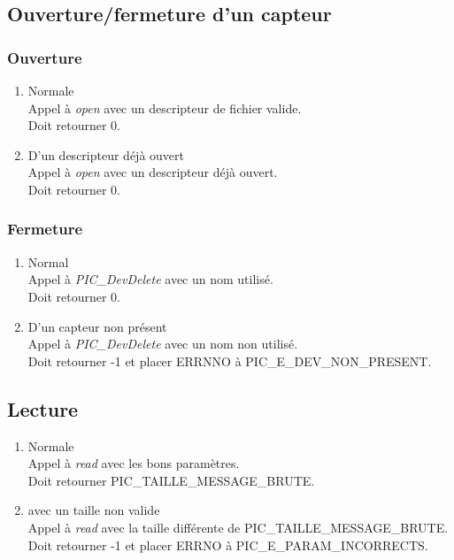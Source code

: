 \subsection{Ouverture/fermeture d'un capteur}
    \subsubsection{Ouverture}
        \begin{enumerate}
            \item Normale\\
Appel à \textsl{open} avec un descripteur de fichier valide.\\
Doit retourner 0.
            \item D'un descripteur déjà ouvert\\
Appel à \textsl{open} avec un descripteur déjà ouvert.\\
Doit retourner 0.
        \end{enumerate}

    \subsubsection{Fermeture}
        \begin{enumerate}
            \item Normal\\
Appel à \textsl{PIC\_DevDelete} avec un nom utilisé.\\
Doit retourner 0.
            \item D'un capteur non présent\\
Appel à \textsl{PIC\_DevDelete} avec un nom non utilisé.\\
Doit retourner -1 et placer ERRNNO à PIC\_E\_DEV\_NON\_PRESENT.
        \end{enumerate}

\subsection{Lecture}

        \begin{enumerate}
            \item Normale\\
Appel à \textsl{read} avec les bons paramètres.\\
Doit retourner PIC\_TAILLE\_MESSAGE\_BRUTE.
            \item avec un taille non valide\\
Appel à \textsl{read} avec la taille différente de PIC\_TAILLE\_MESSAGE\_BRUTE.\\
Doit retourner -1 et placer ERRNO à PIC\_E\_PARAM\_INCORRECTS.
        \end{enumerate}


